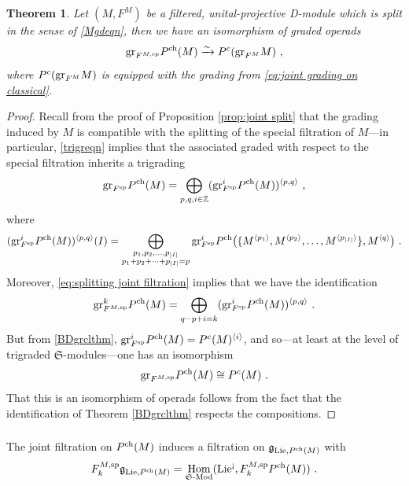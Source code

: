 \documentclass[11pt]{amsart}
\numberwithin{equation}{section}
\newtheorem{theo}{Theorem}[section]
\theoremstyle{definition}
\newcommand{\mf}{\mathfrak}
\newcommand{\spe}{{\textup{sp}}}
\DeclareMathOperator{\Hom}{Hom}
\newcommand{\Mod}{{\textup{-Mod}}}
\newcommand{\Lie}{{\textup{Lie}}}
\newcommand{\ch}{{\textup{ch}}}
\newcommand{\ash}{{\textup{\mbox{!`}}}}
\newcommand{\Ss}{{{\mf{S}}}}
\newcommand{\0}{{\textbf{0}}}
\newcommand{\gr}{\textup{gr}}
\def\IZ{\mathbb{Z}}
\def\ch{{\rm ch}}
\def\gf{\mathfrak{g}}
\def \mf{\mathfrak}
\begin{document}
\begin{theo}\label{thm:gr of joint chiral is joint classical}
Let $(M,F^M)$ be a filtered, unital-projective D-module which is split in the sense of \eqref{Mgdeqn}, then we have an isomorphism of graded operads
	\[
	\gr_{F^{M,\spe}}P^\ch(M) \xrightarrow{\sim} P^c( \gr_{F^M} M)~,
	\]
	where $P^c(\gr_{F^M} M)$ is equipped with the grading from \eqref{eq:joint grading on classical}.
\end{theo}
\begin{proof}
Recall from the proof of Proposition \ref{prop:joint split} that the grading induced by $M$ is compatible with the splitting of the special filtration of $M$---in particular, \eqref{trigreqn} implies that the associated graded with respect to the special filtration inherits a trigrading
\[
\gr_{F^\spe} P^\ch(M) = \bigoplus_{p,q,i\in \IZ} (\gr^i_{F^\spe} P^\ch(M))^{\langle p,q \rangle}~,
\]
where 
\[
(\gr^i_{F^\spe}P^\ch(M))^{\langle p ,q\rangle}(I)  = \bigoplus_{\substack{p_1,p_2,\dots,p_{|I|}\\ p_1+p_2+\dots+ p_{|I|} =p}} \gr^i_{F^\spe}P^\ch\big(\{M^{\langle p_1\rangle},M^{\langle p_2\rangle },\dots,M^{\langle p_{|I|} \rangle}\},M^{\langle q\rangle}\big)~.
\]
Moreover, \eqref{eq:splitting joint filtration} implies that we have the identification
\[
\gr^k_{F^{M,\spe}}P^\ch(M) = \bigoplus_{q-p+i=k} (\gr^i_{F^\spe} P^\ch(M))^{\langle p,q\rangle}~.
\]
But from \ref{BDgrclthm}, $\gr^i_{F^\spe}P^\ch(M) = P^c(M)^{\langle i\rangle}$, and so---at least at the level of trigraded $\Ss$-modules---one has an isomorphism
\[
\gr_{F^{M,\spe}} P^\ch(M) \cong P^c(M)~.
\]
That this is an isomorphism of operads follows from the fact that the identification of Theorem \ref{BDgrclthm} respects the compositions.
\end{proof}

\subsubsection{}

The joint filtration on $P^\ch(M)$ induces a filtration on $\gf_{\Lie, P^\ch(M)}$ with 
\[
F^{M,\spe}_k \gf_{\Lie,P^\ch(M)} = \Hom_{\Ss\Mod}(\Lie^\ash,F^{M,\spe}_k P^\ch(M))~.
\]
\end{document}
